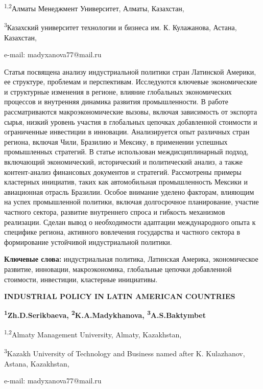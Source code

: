 \begin{affiliation}
\textsuperscript{1,2}Алматы Менеджмент Университет, Алматы, Казахстан,

\textsuperscript{3}Казахский университет технологии и бизнеса им. К. Кулажанова, Астана, Казахстан,

e-mail: madyxanova77@mail.ru
\end{affiliation}

Статья посвящена анализу индустриальной политики стран Латинской
Америки, ее структуре, проблемам и перспективам. Исследуются ключевые
экономические и структурные изменения в регионе, влияние глобальных
экономических процессов и внутренняя динамика развития промышленности. В
работе рассматриваются макроэкономические вызовы, включая зависимость от
экспорта сырья, низкий уровень участия в глобальных цепочках добавленной
стоимости и ограниченные инвестиции в инновации. Анализируется опыт
различных стран региона, включая Чили, Бразилию и Мексику, в применении
успешных промышленных стратегий. В статье использован междисциплинарный
подход, включающий экономический, исторический и политический анализ, а
также контент-анализ финансовых документов и стратегий. Рассмотрены
примеры кластерных инициатив, таких как автомобильная промышленность
Мексики и авиационная отрасль Бразилии. Особое внимание уделено
факторам, влияющим на успех промышленной политики, включая долгосрочное
планирование, участие частного сектора, развитие внутреннего спроса и
гибкость механизмов реализации. Сделан вывод о необходимости адаптации
международного опыта к специфике региона, активного вовлечения
государства и частного сектора в формирование устойчивой индустриальной
политики.

{\bfseries Ключевые слова:} индустриальная политика, Латинская Америка,
экономическое развитие, инновации, макроэкономика, глобальные цепочки
добавленной стоимости, инвестиции, кластерные инициативы.

\begin{articleheader}
{\bfseries INDUSTRIAL POLICY IN LATIN AMERICAN COUNTRIES}

{\bfseries
\textsuperscript{1}Zh.D.Serikbaeva,
\textsuperscript{2}K.A.Madykhanova\textsuperscript{\envelope },
\textsuperscript{3}A.S.Baktymbet
}
\end{articleheader}

\begin{affiliation}
\textsuperscript{1,2}Almaty Management University, Almaty, Kazakhstan,

\textsuperscript{3}Kazakh University of Technology and Business named after K. Kulazhanov, Astana, Kazakhstan,

e-mail: madyxanova77@mail.ru
\end{affiliation}

